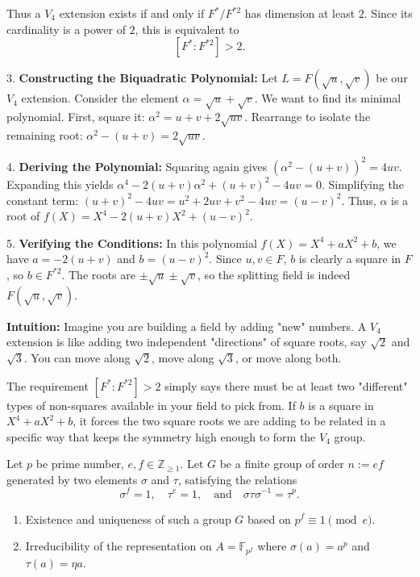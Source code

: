 \begin{solution}
Thus a $V_4$ extension exists if and only if $F^*/F^{*2}$ has dimension at least $2$. Since its cardinality is a power of $2$, this is equivalent to
\[
[F^*:F^{*2}]>2.
\]

3. \textbf{Constructing the Biquadratic Polynomial:} Let $L = F(\sqrt{u}, \sqrt{v})$ be our $V_4$ extension. Consider the element $\alpha = \sqrt{u} + \sqrt{v}$. We want to find its minimal polynomial. First, square it: $\alpha^2 = u + v + 2\sqrt{uv}$. Rearrange to isolate the remaining root: $\alpha^2 - (u+v) = 2\sqrt{uv}$.

4. \textbf{Deriving the Polynomial:} Squaring again gives $(\alpha^2 - (u+v))^2 = 4uv$. Expanding this yields $\alpha^4 - 2(u+v)\alpha^2 + (u+v)^2 - 4uv = 0$. Simplifying the constant term: $(u+v)^2 - 4uv = u^2 + 2uv + v^2 - 4uv = (u-v)^2$. Thus, $\alpha$ is a root of $f(X) = X^4 - 2(u+v)X^2 + (u-v)^2$.

5. \textbf{Verifying the Conditions:} In this polynomial $f(X) = X^4 + aX^2 + b$, we have $a = -2(u+v)$ and $b = (u-v)^2$. Since $u, v \in F$, $b$ is clearly a square in $F$, so $b \in F^{*2}$. The roots are $\pm \sqrt{u} \pm \sqrt{v}$, so the splitting field is indeed $F(\sqrt{u}, \sqrt{v})$.

\textbf{Intuition:}
Imagine you are building a field by adding "new" numbers. A $V_4$ extension is like adding two independent "directions" of square roots, say $\sqrt{2}$ and $\sqrt{3}$. You can move along $\sqrt{2}$, move along $\sqrt{3}$, or move along both. 

The requirement $[F^* : F^{*2}] > 2$ simply says there must be at least two "different" types of non-squares available in your field to pick from. If $b$ is a square in $X^4 + aX^2 + b$, it forces the two square roots we are adding to be related in a specific way that keeps the symmetry high enough to form the $V_4$ group.

\end{solution}

\begin{exercise}
\label{algebra:2025:2}
Let $p$ be prime number, $e, f \in \mathbb{Z}_{\geq 1}$. Let $G$ be a finite group of order $n := ef$ generated by two elements $\sigma$ and $\tau$, satisfying the relations
\[
\sigma^f = 1, \quad \tau^e = 1, \quad \text{and} \quad \sigma\tau\sigma^{-1} = \tau^p.
\]

\begin{enumerate}
\item[(1)] Existence and uniqueness of such a group $G$ based on $p^f \equiv 1 \pmod{e}$.
\item[(2)] Irreducibility of the representation on $A = \mathbb{F}_{p^f}$ where $\sigma(a)=a^p$ and $\tau(a)=\eta a$.
\end{enumerate}
\end{exercise}

